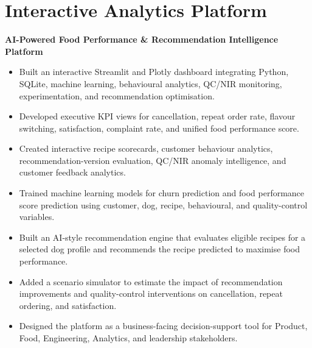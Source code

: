 
\section*{Interactive Analytics Platform}

\textbf{AI-Powered Food Performance \& Recommendation Intelligence Platform}

\begin{itemize}
    \item Built an interactive Streamlit and Plotly dashboard integrating Python, SQLite, machine learning, behavioural analytics, QC/NIR monitoring, experimentation, and recommendation optimisation.
    \item Developed executive KPI views for cancellation, repeat order rate, flavour switching, satisfaction, complaint rate, and unified food performance score.
    \item Created interactive recipe scorecards, customer behaviour analytics, recommendation-version evaluation, QC/NIR anomaly intelligence, and customer feedback analytics.
    \item Trained machine learning models for churn prediction and food performance score prediction using customer, dog, recipe, behavioural, and quality-control variables.
    \item Built an AI-style recommendation engine that evaluates eligible recipes for a selected dog profile and recommends the recipe predicted to maximise food performance.
    \item Added a scenario simulator to estimate the impact of recommendation improvements and quality-control interventions on cancellation, repeat ordering, and satisfaction.
    \item Designed the platform as a business-facing decision-support tool for Product, Food, Engineering, Analytics, and leadership stakeholders.
\end{itemize}
